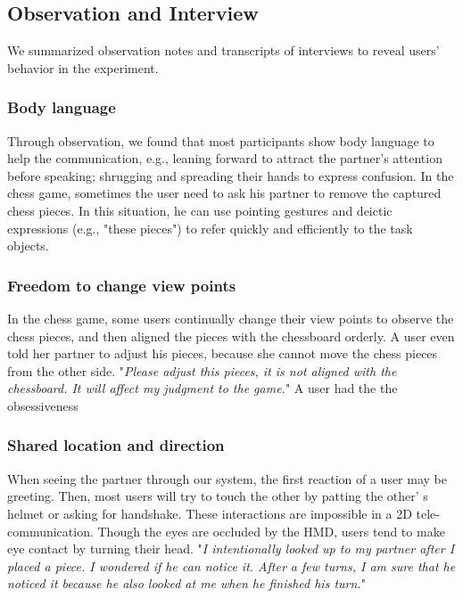 \subsection{Observation and Interview}

We summarized observation notes and transcripts of interviews to reveal users' behavior in the experiment.

\subsubsection{Body language}

Through observation, we found that most participants show body language to help the communication, e.g., leaning forward to attract the partner’s attention before speaking; shrugging and spreading their hands to express confusion. In the chess game, sometimes the user need to ask his partner to remove the captured chess pieces. In this situation, he can use pointing gestures and deictic expressions (e.g., "these pieces") to refer quickly and efficiently to the task objects.

\subsubsection{Freedom to change view points}

In the chess game, some users continually change their view points to observe the chess pieces, and then aligned the pieces with the chessboard orderly. A user even told her partner to adjust his pieces, because she cannot move the chess pieces from the other side. "\emph{Please adjust this pieces, it is not aligned with the chessboard. It will affect my judgment to the game.}" A user had the the obsessiveness 

\subsubsection{Shared location and direction}

When seeing the partner through our system, the first reaction of a user may be greeting. Then, most users will try to touch the other by patting the other' s helmet or asking for handshake. These interactions are impossible in a 2D tele-communication. Though the eyes are occluded by the HMD, users tend to make eye contact by turning their head. "\emph{I intentionally looked up to my partner after I placed a piece. I wondered if he can notice it. After a few turns, I am sure that he noticed it because he also looked at me when he finished his turn.}"

